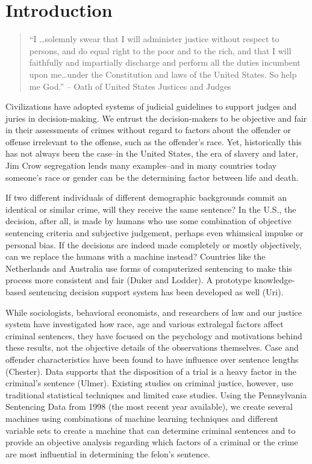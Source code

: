 \documentclass[11pt,letter]{article}
\begin{document}
\section{Introduction}
\begin{quote}
``I \ldots solemnly swear that I will administer justice without respect to persons, and do equal right to the poor and to the rich, and that I will faithfully and impartially discharge and perform all the duties incumbent upon me\ldots under the Constitution and laws of the United States. So help me God.''
-- Oath of United States Justices and Judges
\end{quote}
Civilizations have adopted systems of judicial guidelines to support judges and juries in decision-making. We entrust the decision-makers to be objective and fair in their assessments of crimes without regard to factors about the offender or offense irrelevant to the offense, such as the offender's race. Yet, historically this has not always been the case--in the United States, the era of slavery and later, Jim Crow segregation lends many examples--and in many countries today someone's race or gender can be the determining factor between life and death. 

If two different individuals of different demographic backgrounds commit an identical or similar crime, will they receive the same sentence? In the U.S., the decision, after all, is made by humans who use some combination of objective sentencing criteria and subjective judgement, perhaps even whimsical impulse or personal bias. If the decisions are indeed made completely or mostly objectively, can we replace the humans with a machine instead? Countries like the Netherlands and Australia use forms of computerized sentencing to make this process more consistent and fair (Duker and Lodder). A prototype knowledge-based sentencing decision support system has been developed as well (Uri). 

While sociologists, behavioral economists, and researchers of law and our justice system have investigated how race, age and various extralegal factors affect criminal sentences, they have focused on the psychology and motivations behind these results, not the objective details of the observations themselves.  Case and offender characteristics have been found to have influence over sentence lengths (Chester). Data supports that the disposition of a trial is a heavy factor in the criminal's sentence (Ulmer). Existing studies on criminal justice, however, use traditional statistical techniques and limited case studies. Using the Pennsylvania Sentencing Data from 1998 (the most recent year available), we create several machines using combinations of machine learning techniques and different variable sets to create a machine that can determine criminal sentences and to provide an objective analysis regarding which factors of a criminal or the crime are most influential in determining the felon's sentence.
\end{document}
